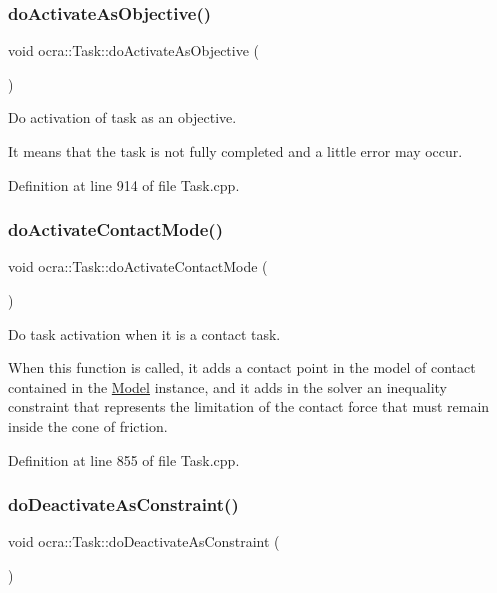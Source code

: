 \subsubsection{\texorpdfstring{do\+Activate\+As\+Objective()}{doActivateAsObjective()}}
{\footnotesize\ttfamily void ocra\+::\+Task\+::do\+Activate\+As\+Objective (\begin{DoxyParamCaption}{ }\end{DoxyParamCaption})\hspace{0.3cm}{\ttfamily [protected]}}

Do activation of task as an objective.

It means that the task is not fully completed and a little error may occur. 

Definition at line 914 of file Task.\+cpp.

\hypertarget{classocra_1_1Task_acbee7ddb69459ff0d2e450dbe6195b49}{}\label{classocra_1_1Task_acbee7ddb69459ff0d2e450dbe6195b49} 
\subsubsection{\texorpdfstring{do\+Activate\+Contact\+Mode()}{doActivateContactMode()}}
{\footnotesize\ttfamily void ocra\+::\+Task\+::do\+Activate\+Contact\+Mode (\begin{DoxyParamCaption}{ }\end{DoxyParamCaption})\hspace{0.3cm}{\ttfamily [protected]}}

Do task activation when it is a contact task.

When this function is called, it adds a contact point in the model of contact contained in the \hyperlink{classocra_1_1Model}{Model} instance, and it adds in the solver an inequality constraint that represents the limitation of the contact force that must remain inside the cone of friction. 

Definition at line 855 of file Task.\+cpp.

\hypertarget{classocra_1_1Task_a9f7261991e6aa056a02ec7f3dd4ea72a}{}\label{classocra_1_1Task_a9f7261991e6aa056a02ec7f3dd4ea72a} 
\subsubsection{\texorpdfstring{do\+Deactivate\+As\+Constraint()}{doDeactivateAsConstraint()}}
{\footnotesize\ttfamily void ocra\+::\+Task\+::do\+Deactivate\+As\+Constraint (\begin{DoxyParamCaption}{ }\end{DoxyParamCaption})\hspace{0.3cm}{\ttfamily [protected]}}

